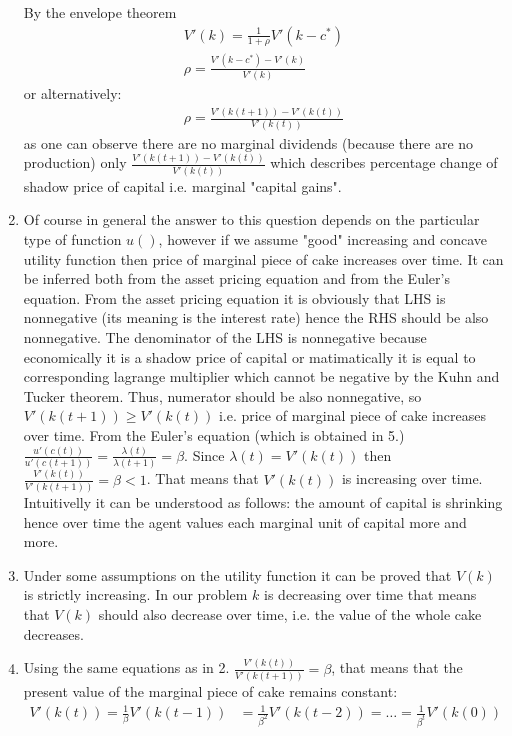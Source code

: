\documentclass[a4paper]{article}
\begin{document}
\begin{enumerate}
	
	By the envelope theorem
	\begin{align*}
	V'(k) = \frac{1}{1+\rho}V'(k-c^*)\\
	\rho = \frac{V'(k-c^*) - V'(k)}{V'(k)}
	\end{align*}
	or alternatively:
	\begin{align*}
	\rho = \frac{V'(k(t+1)) - V'(k(t))}{V'(k(t))}
	\end{align*}
	as one can observe there are no marginal dividends (because there are no production) only $\frac{V'(k(t+1)) - V'(k(t))}{V'(k(t))}$ which describes percentage change of shadow price of capital i.e. marginal "capital gains". 
	\item Of course in general the answer to this question depends on the particular type of function $u()$, however if we assume "good" increasing and concave utility function then price of marginal piece of cake increases over time. It can be inferred both from the asset pricing equation and from the Euler's equation. From the asset pricing equation it is obviously that LHS is nonnegative (its meaning is the interest rate) hence the RHS should be also nonnegative. The denominator of the LHS is nonnegative because economically it is a shadow price of capital or matimatically it is equal to corresponding lagrange multiplier which cannot be negative by the Kuhn and Tucker theorem. Thus, numerator should be also nonnegative, so $V'(k(t+1)) \ge V'(k(t))$ i.e. price of marginal piece of cake increases over time. From the Euler's equation (which is obtained in 5.) $\frac{u'(c(t))}{u'(c(t+1))} = \frac{\lambda(t)}{\lambda(t+1)} = \beta$. Since $\lambda(t) = V'(k(t))$ then $\frac{V'(k(t))}{V'(k(t+1))} = \beta < 1$. That means that $V'(k(t))$ is increasing over time. Intuitivelly it can be understood as follows: the amount of capital is shrinking hence over time the agent values each marginal unit of capital more and more. 
	\item Under some assumptions on the utility function it can be proved that $V(k)$ is strictly increasing. In our problem $k$ is decreasing over time that means that $V(k)$ should also decrease over time, i.e. the value of the whole cake decreases.
	\item Using the same equations as in 2. $\frac{V'(k(t))}{V'(k(t+1))} = \beta$, that means that the present value of the marginal piece of cake remains constant: \begin{align*}
	V'(k(t)) = \frac{1}{\beta}V'(k(t-1)) &= \frac{1}{\beta^2}V'(k(t-2)) = \dots = \frac{1}{\beta^t}V'(k(0))\\

\end{align*}
\end{enumerate}
\end{document}
